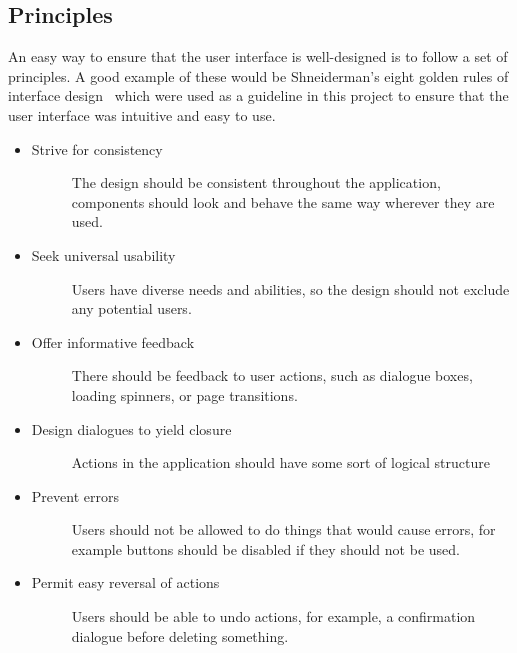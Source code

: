 \subsection{Principles}
An easy way to ensure that the user interface is well-designed is to follow a set of principles. A good example of these would be Shneiderman's eight golden rules of interface design~\cite{Shneiderman} which were used as a guideline in this project to ensure that the user interface was intuitive and easy to use. %
\iffalse
\begin{itemize}
    \item Strive for consistency
    \begin{description}
        \item[] The design should be consistent throughout the application, components should look and behave the same way wherever they are used.
    \end{description}
    \item Seek universal usability
    \begin{description}
        \item[] Users have diverse needs and abilities, so the design should not exclude any potential users.
    \end{description}
    \item Offer informative feedback
    \begin{description}
        \item[] There should be feedback to user actions, such as dialogue boxes, loading spinners, or page transitions.
    \end{description}
    \item Design dialogues to yield closure
    \begin{description}
        \item[] Actions in the application should have some sort of logical structure
    \end{description}
    \item Prevent errors
    \begin{description}
        \item[] Users should not be allowed to do things that would cause errors, for example buttons should be disabled if they should not be used.
    \end{description}
    \item Permit easy reversal of actions
    \begin{description}
        \item[] Users should be able to undo actions, for example, a confirmation dialogue before deleting something.

\end{description}
\end{itemize}
